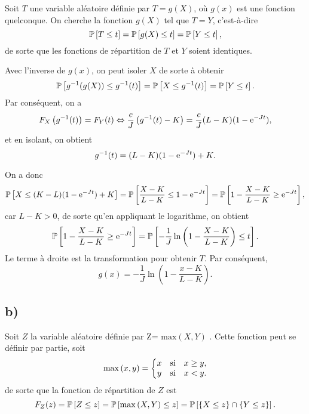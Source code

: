 \documentclass[11pt]{article}
\renewcommand\P[1]{%
	\ensuremath{%
		\mathbb{P}\left[#1\right]%
	}%
}%
\newcommand\Max[2]{%
	\ensuremath{%
		\mathrm{max}\left(#1,#2\right)%
	}%
}%
\newcommand\e{%
    \ensuremath{%
        \mathrm{e}%
    }%
}
\begin{document}
Soit $T$ une variable aléatoire définie par $T=g(X)$, où $g(x)$ est une fonction
quelconque. On cherche la fonction $g(X)$ tel que $T=Y$, c'est-à-dire
\begin{equation*}
    \P{T\leq t}
    =\P{g(X)\leq t}
    =\P{Y\leq t},
\end{equation*}
de sorte que les fonctions de répartition de $T$ et $Y$ soient identiques.

Avec l'inverse de $g(x)$, on peut isoler $X$ de sorte à obtenir
\begin{equation*}
    \P{g^{-1}(g(X))\leq g^{-1}(t)}
    =\P{X\leq g^{-1}(t)}
    =\P{Y\leq t}.
\end{equation*}
Par conséquent, on a
\begin{equation*}
    F_X\left(g^{-1}(t)\right)
    =F_Y(t)
    \Leftrightarrow
    \frac{c}{J}\left(g^{-1}(t)-K\right)
    =\frac{c}{J}(L-K)(1-\e^{-Jt}),
\end{equation*}
et en isolant, on obtient
\begin{equation*}
    g^{-1}(t)
    =(L-K)(1-\e^{-Jt})+K.
\end{equation*}

On a donc
\begin{equation*}
    \P{X\leq (K-L)(1-\e^{-Jt})+K}
    =\P{\frac{X-K}{L-K}\leq 1-\e^{-Jt}}
    =\P{1-\frac{X-K}{L-K}\geq \e^{-Jt}},
\end{equation*}
car $L-K>0$, de sorte qu'en appliquant le logarithme, on obtient
\begin{equation*}
    \P{1-\frac{X-K}{L-K}\geq \e^{-Jt}}
    =\P{-\frac{1}{J}\ln\left(1-\frac{X-K}{L-K}\right)\leq t}.
\end{equation*}
Le terme à droite est la transformation pour obtenir $T$. Par conséquent,
\begin{equation*}
    g(x)=-\frac{1}{J}\ln\left(1-\frac{x-K}{L-K}\right).
\end{equation*}

\subsection{b)}
Soit $Z$ la variable aléatoire définie par Z=\Max{X}{Y}. Cette fonction
peut se définir par partie, soit
\begin{equation*}
    \Max{x}{y}=\left\{
        \begin{matrix}
            x & \text{si} & x\geq y,\\
            y & \text{si} & x  <  y.\\
        \end{matrix}
    \right.
\end{equation*}
de sorte que la fonction de répartition de $Z$ est
\begin{equation*}
    F_Z(z)
    =\P{Z\leq z}
    =\P{\Max{X}{Y}\leq z}
    =\P{\left\{X\leq z\right\}\cap\left\{Y\leq z\right\}}.
\end{equation*}
\end{document}
